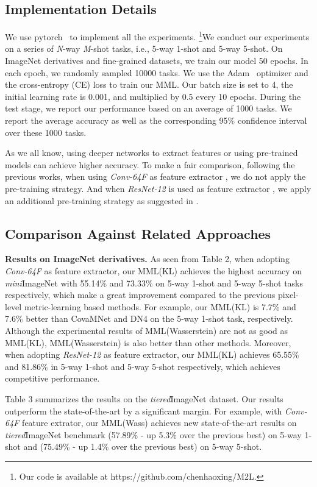 \documentclass[10pt,twocolumn,letterpaper]{article}
\begin{document}
\subsection{Implementation Details}
We use pytorch~\cite{pytorch19nips} to implement all the experiments. \footnote{Our code is available at https://github.com/chenhaoxing/M2L.}We conduct our experiments on a series of \emph{N}-way \emph{M}-shot tasks, i.e., 5-way 1-shot and 5-way 5-shot.
On ImageNet derivatives and fine-grained datasets, we train our model 50 epochs.
In each epoch, we randomly sampled 10000 tasks. 
We use the Adam~\cite{kingma2014adam} optimizer and the cross-entropy (CE) loss to train our MML. Our batch size is set to 4, the initial learning rate is 0.001, and multiplied by 0.5 every 10 epochs. During the test stage, we report our performance based on an average of 1000 tasks. We report the average accuracy as well as the corresponding 95\% confidence interval over these 1000 tasks.

As we all know, using deeper networks to extract features or using pre-trained models can achieve higher accuracy. To make a fair comparison, following the previous works, when using \emph{Conv-64F} as feature extractor , we do not apply the pre-training strategy. And when \emph{ResNet-12} is used as feature extractor , we apply an additional pre-training strategy as suggested in \cite{liu20eccv}. 
\subsection{Comparison Against Related Approaches}
\textbf{Results on ImageNet derivatives.} 
As seen from Table 2, when adopting \emph{Conv-64F} as feature extractor, our MML(KL) achieves the highest accuracy on \emph{mini}ImageNet with 55.14\% and 73.33\% on 5-way 1-shot and 5-way 5-shot tasks respectively, which make a great improvement compared to the previous pixel-level metric-learning based methods. For example, our MML(KL) is 7.7\% and 7.6\% better than CovaMNet and DN4 on the 5-way 1-shot task, respectively. Although the experimental results of MML(Wasserstein) are not as good as MML(KL), MML(Wasserstein) is also better than other methods. 
Moreover, when adopting \emph{ResNet-12} as feature extractor, our MML(KL) achieves 65.55\% and 81.86\% in 5-way 1-shot and 5-way 5-shot respectively, which achieves competitive performance.

Table 3 summarizes the results on the \emph{tiered}ImageNet dataset. Our results outperform the state-of-the-art by a significant margin. For example, with \emph{Conv-64F} feature extrator, our MML(Wass) achieves new state-of-the-art results on \emph{tiered}ImageNet benchmark (57.89\% - up 5.3\% over the previous best) on 5-way 1-shot and (75.49\% - up 1.4\% over the previous best) on 5-way 5-shot. 
\end{document}

